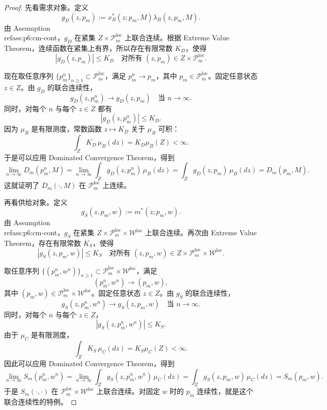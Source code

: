 \begin{proof}
先看需求对象。定义
\[
g_D(z,p_m):=x_B^*(z;p_m,M)\lambda_B(z,p_m,M).
\]
由 Assumption~\\ref{ass:p6:cm-cont}，$g_D$ 在紧集 $Z\times\mathcal P_m^{\mathrm{loc}}$ 上联合连续。根据 Extreme Value Theorem，连续函数在紧集上有界，所以存在有限常数 $K_D$，使得
\[
|g_D(z,p_m)|\le K_D
\quad\text{对所有 } (z,p_m)\in Z\times\mathcal P_m^{\mathrm{loc}}.
\]

现在取任意序列 $\{p_m^n\}_{n\ge 1}\subset\mathcal P_m^{\mathrm{loc}}$，满足 $p_m^n\to p_m$，其中 $p_m\in\mathcal P_m^{\mathrm{loc}}$。固定任意状态 $z\in Z$。由 $g_D$ 的联合连续性，
\[
g_D(z,p_m^n)\to g_D(z,p_m)
\quad\text{当 } n\to\infty.
\]
同时，对每个 $n$ 与每个 $z\in Z$ 都有
\[
|g_D(z,p_m^n)|\le K_D.
\]
因为 $\mu_B$ 是有限测度，常数函数 $z\mapsto K_D$ 关于 $\mu_B$ 可积：
\[
\int_Z K_D\,\mu_B(dz)=K_D\mu_B(Z)<\infty.
\]
于是可以应用 Dominated Convergence Theorem，得到
\[
\lim_{n\to\infty} D_m(p_m^n,M)
=
\lim_{n\to\infty}\int_Z g_D(z,p_m^n)\,\mu_B(dz)
=
\int_Z g_D(z,p_m)\,\mu_B(dz)
=
D_m(p_m,M).
\]
这就证明了 $D_m(\cdot,M)$ 在 $\mathcal P_m^{\mathrm{loc}}$ 上连续。

再看供给对象。定义
\[
g_S(z,p_m,w):=m^*(z;p_m,w).
\]
由 Assumption~\\ref{ass:p6:cm-cont}，$g_S$ 在紧集 $Z\times\mathcal P_m^{\mathrm{loc}}\times\mathcal W^{\mathrm{loc}}$ 上联合连续。再次由 Extreme Value Theorem，存在有限常数 $K_S$，使得
\[
|g_S(z,p_m,w)|\le K_S
\quad\text{对所有 } (z,p_m,w)\in Z\times\mathcal P_m^{\mathrm{loc}}\times\mathcal W^{\mathrm{loc}}.
\]

取任意序列 $\{(p_m^n,w^n)\}_{n\ge 1}\subset\mathcal P_m^{\mathrm{loc}}\times\mathcal W^{\mathrm{loc}}$，满足
\[
(p_m^n,w^n)\to(p_m,w),
\]
其中 $(p_m,w)\in\mathcal P_m^{\mathrm{loc}}\times\mathcal W^{\mathrm{loc}}$。固定任意状态 $z\in Z$。由 $g_S$ 的联合连续性，
\[
g_S(z,p_m^n,w^n)\to g_S(z,p_m,w)
\quad\text{当 } n\to\infty.
\]
同时，对每个 $n$ 与每个 $z\in Z$，
\[
|g_S(z,p_m^n,w^n)|\le K_S.
\]
由于 $\mu_C$ 是有限测度，
\[
\int_Z K_S\,\mu_C(dz)=K_S\mu_C(Z)<\infty.
\]
因此可以应用 Dominated Convergence Theorem，得到
\[
\lim_{n\to\infty} S_m(p_m^n,w^n)
=
\lim_{n\to\infty}\int_Z g_S(z,p_m^n,w^n)\,\mu_C(dz)
=
\int_Z g_S(z,p_m,w)\,\mu_C(dz)
=
S_m(p_m,w).
\]
于是 $S_m(\cdot,\cdot)$ 在 $\mathcal P_m^{\mathrm{loc}}\times\mathcal W^{\mathrm{loc}}$ 上联合连续。对固定 $w$ 时的 $p_m$ 连续性，就是这个联合连续性的特例。
\end{proof}

